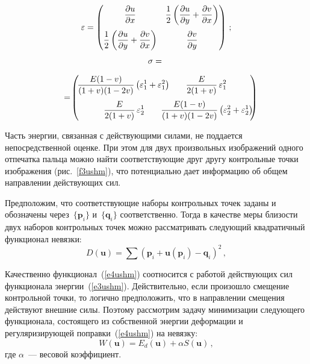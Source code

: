 \begin{multicols}{2}
\noindent
\begin{equation*}
\varepsilon  = 
\begin{pmatrix}
\displaystyle\frac{\displaystyle \partial u\mathstrut}{\displaystyle \partial x\mathstrut} & \displaystyle\frac{\displaystyle 1\mathstrut}{\displaystyle 2\mathstrut}\left ( \displaystyle\frac{\displaystyle \partial u\mathstrut}{\displaystyle \partial y\mathstrut}+\displaystyle\frac{\displaystyle \partial v\mathstrut}{\displaystyle \partial 
x\mathstrut}\right )\\[12pt]
\displaystyle\frac{\displaystyle 1\mathstrut}{\displaystyle 2\mathstrut}\left ( \displaystyle\frac{\displaystyle \partial u\mathstrut}{\displaystyle \partial y\mathstrut}+\displaystyle\frac{\displaystyle \partial v\mathstrut}{\displaystyle \partial x\mathstrut}\right ) & \displaystyle\frac{\displaystyle \partial 
v\mathstrut}{\displaystyle \partial y\mathstrut}
\end{pmatrix}\,;
\end{equation*}
\begin{multline*}
\sigma  ={} \\[6pt]
\!{}=\!
\begin{pmatrix}
\!\fr{E(1-v)}{(1+v)(1-2v)}\left ( \varepsilon_1^1+\varepsilon_1^2\right )\!\!\!\! \!\!& \!\!\!\!\!\!
\fr{E}{2(1+v)}\,\varepsilon_1^2\!\\[12pt]
\!\fr{E}{2(1+v)}\,\varepsilon_2^1 \!\! \!\!\!\!\!&\!\!\!\!\!\! \fr{E(1-v)}{(1+v)(1-2v)}\left ( 
\varepsilon_2^2+\varepsilon_2^1\right )\!\!
\end{pmatrix}\hspace*{-9.65pt}
\end{multline*}

\medskip
      
      Часть энергии, связанная с действующими силами, не поддается непосредственной 
оценке. При этом для двух произвольных изображений одного отпечатка пальца можно 
найти соответствующие друг другу контрольные точки изображения (рис.~\ref{f3ushm}), 
что потенциально дает информацию об общем направлении действующих сил. 
      
      
      Предположим, что соответствующие наборы контрольных точек заданы и 
обозначены через~$\{\mathbf{p}_i\}$ и~$\{\mathbf{q}_i\}$ соответственно. Тогда в 
качестве меры близости двух наборов контрольных точек можно рассматривать 
следующий квадратичный функционал невязки:
      \begin{equation}
      D\left( \mathbf{u}\right) = \sum \left ( \mathbf{p}_i+\mathbf{u}\left (\mathbf{p}_i\right 
) -\mathbf{q}_i\right )^2\,,
      \label{e4ushm}
      \end{equation}
      
      Качественно функционал~(\ref{e4ushm}) соотносится с работой действующих сил 
функционала энергии~(\ref{e3ushm}). Действительно, если произошло смещение 
контрольной точки, то логично предположить, что в направлении смещения действуют 
внешние силы. Поэтому рассмотрим задачу минимизации следующего функционала, 
состоящего из собственной энергии деформации и регуляризирующей 
поправки~(\ref{e4ushm}) на невязку:
      \begin{equation}
      W(\mathbf{u})=E_d(\mathbf{u}) +\alpha S(\mathbf{u})\,,
      \label{e5ushm}
      \end{equation}
где $\alpha$~--- весовой коэффициент. 


\end{multicols}
